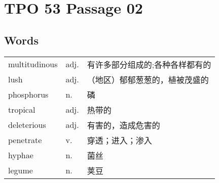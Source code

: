 \section{TPO 53 Passage 02}

\subsection{Words}

\begin{tabular}{lll}
    multitudinous & adj. & 有许多部分组成的;各种各样都有的 \\
    lush          & adj. & （地区）郁郁葱葱的，植被茂盛的  \\
    phosphorus    & n.   & 磷                \\
    tropical      & adj. & 热带的              \\
    deleterious   & adj. & 有害的，造成危害的        \\
    penetrate     & v.   & 穿透；进入；渗入         \\
    hyphae        & n.   & 菌丝               \\
    legume        & n.   & 荚豆               \\
\end{tabular}
